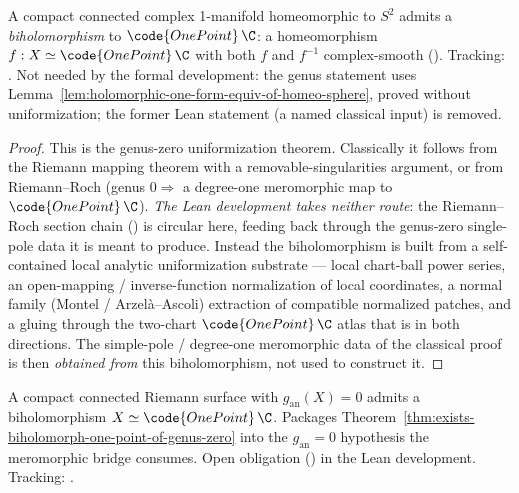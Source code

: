 \begin{theorem}
\label{thm:exists-biholomorph-one-point-of-genus-zero}
A compact connected complex 1-manifold homeomorphic to \(S^2\) admits a
\emph{biholomorphism} to \(\code{OnePoint}\,\C\): a homeomorphism
\(f:X\simeq\code{OnePoint}\,\C\) with both \(f\) and \(f^{-1}\) complex-smooth
().
Tracking: .
Not needed by the formal development: the genus statement uses
Lemma~\ref{lem:holomorphic-one-form-equiv-of-homeo-sphere}, proved without
uniformization; the former Lean statement (a named classical input) is removed.
\end{theorem}
\begin{proof}
This is the genus-zero uniformization theorem. Classically it follows from the
Riemann mapping theorem with a removable-singularities argument, or from
Riemann--Roch (genus \(0\Rightarrow\) a degree-one meromorphic map to
\(\code{OnePoint}\,\C\)). \emph{The Lean development takes neither route}: the
Riemann--Roch section chain () is circular
here, feeding back through the genus-zero single-pole data it is meant to
produce. Instead the biholomorphism is built from a self-contained local
analytic uniformization substrate --- local chart-ball power series, an
open-mapping / inverse-function normalization of local coordinates, a normal
family (Montel / Arzel\`a--Ascoli) extraction of compatible normalized patches,
and a gluing through the two-chart \(\code{OnePoint}\,\C\) atlas that is
 in both directions. The simple-pole / degree-one meromorphic
data of the classical proof is then \emph{obtained from} this biholomorphism,
not used to construct it.
\end{proof}

\begin{lemma}
\label{lem:exists-biholomorph-one-point-of-analytic-genus-zero}
A compact connected Riemann surface with \(g_{\mathrm{an}}(X)=0\) admits a
biholomorphism \(X\simeq\code{OnePoint}\,\C\). Packages
Theorem~\ref{thm:exists-biholomorph-one-point-of-genus-zero} into the
\(g_{\mathrm{an}}=0\) hypothesis the meromorphic bridge consumes. Open
obligation () in the Lean development.
Tracking: .
\end{lemma}


